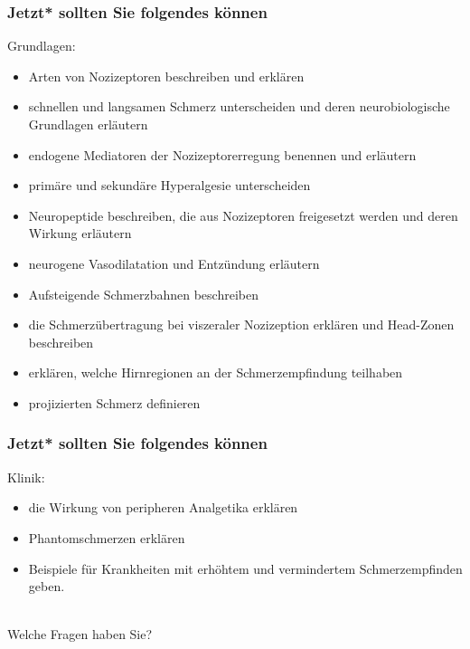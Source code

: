 \documentclass{beamer}
\begin{document}
\begin{frame}


 \frametitle{Jetzt* sollten Sie folgendes können}



\begin{block}{Grundlagen:}




\begin{itemize}

    \item 
    
Arten von Nozizeptoren beschreiben und erklären
    \item 
 schnellen und langsamen Schmerz unterscheiden und deren neurobiologische Grundlagen erläutern
    \item 
 endogene Mediatoren der Nozizeptorerregung benennen und erläutern
    \item 
 primäre und sekundäre Hyperalgesie unterscheiden
    \item 
 Neuropeptide beschreiben, die aus Nozizeptoren freigesetzt werden und deren Wirkung erläutern
    \item 
 neurogene Vasodilatation und Entzündung erläutern
    \item 
 Aufsteigende Schmerzbahnen beschreiben
    \item 
 die Schmerzübertragung bei viszeraler Nozizeption erklären und Head-Zonen beschreiben
    \item 
erklären, welche  Hirnregionen an der Schmerzempfindung teilhaben
    \item 
 projizierten Schmerz definieren

\end{itemize}


\end{block}

\end{frame}


\begin{frame}


 \frametitle{Jetzt* sollten Sie folgendes können}
 

\begin{block}{Klinik:}

\begin{itemize}
    
\item 
die Wirkung von peripheren Analgetika erklären
    \item 
 Phantomschmerzen erklären
    \item 
 Beispiele für Krankheiten mit erhöhtem und vermindertem Schmerzempfinden geben. 

\end{itemize}


\end{block}


$\,$\\[1cm]
\textcolor{theme}{Welche Fragen haben Sie?}


\end{frame}
\end{document}
